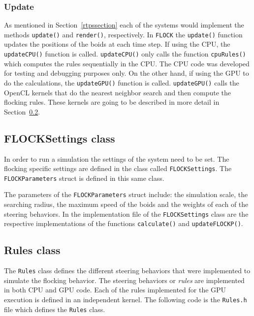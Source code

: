 \subsubsection{Update}
As mentioned in Section~\ref{rtpssection} each of the systems would implement the methods \texttt{update()} and \texttt{render()}, respectively. In \texttt{FLOCK} the \texttt{update()} function updates the positions of the boids at each time step. If using the CPU, the \texttt{updateCPU()} function is called. \texttt{updateCPU()}  only calls the function \texttt{cpuRules()} which computes the rules sequentially in the CPU. The CPU code was developed for testing and debugging purposes only. On the other hand, if using the GPU to do the calculations, the \texttt{updateGPU()} function is called. \texttt{updateGPU()} calls the OpenCL kernels that do the nearest neighbor search and then compute the flocking rules. These kernels are going to be described in more detail in Section~\ref{rulesclass}.


\subsection{FLOCKSettings class}
In order to run a simulation the settings of the system need to be set. The flocking specific settings are defined in the class called \texttt{FLOCKSettings}. The \texttt{FLOCKParameters} struct is defined in this same class. 

The parameters of the \texttt{FLOCKParameters} struct include: the simulation scale, the searching radius, the maximum speed of the boids and the weights of each of the steering behaviors. In the implementation file of the \texttt{FLOCKSettings} class are the respective implementations of the functions \texttt{calculate()} and \texttt{updateFLOCKP()}.

\subsection{Rules class}\label{rulesclass}
The \texttt{Rules} class defines the different steering behaviors that were implemented to simulate the flocking behavior. The steering behaviors or \textit{rules} are implemented in both CPU and GPU code. Each of the rules implemented for the GPU execution is defined in an independent kernel. The following code is the \texttt{Rules.h} file which defines the \texttt{Rules} class.

